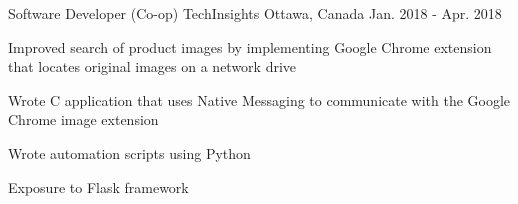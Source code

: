 \begin{cventries}
  \cventry
    {Software Developer (Co-op)} %
    {TechInsights} %
    {Ottawa, Canada} %
    {Jan. 2018 - Apr. 2018} %
    {
      \begin{cvitems} %
        \item{Improved search of product images by implementing Google Chrome extension that locates original images on a network drive   }
        \item{Wrote C application that uses Native Messaging to communicate with the Google Chrome image extension}
        \item{Wrote automation scripts using Python}
        \item{Exposure to Flask framework}
      \end{cvitems}
    }
    
\end{cventries}
